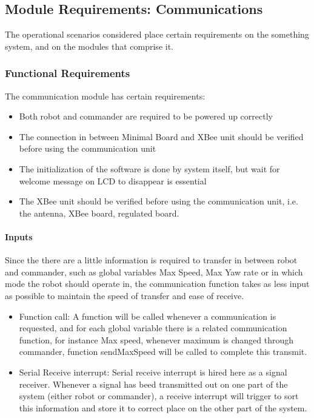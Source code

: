 \documentclass[MTRX3700report.tex]{subfiles}
\begin{document}
\subsection{Module Requirements: Communications}
The operational scenarios considered place certain requirements on the something system, and on the modules that comprise it.
\subsubsection{Functional Requirements}
The communication module has certain requirements:
\begin{itemize}
\item Both robot and commander are required to be powered up correctly
\item The connection in between Minimal Board and XBee unit should be verified before using the communication unit
\item	The initialization of the software is done by system itself, but wait for welcome message on LCD to disappear is essential
\item The XBee unit should be verified before using the communication unit, i.e. the antenna, XBee board, regulated board. 
\end{itemize}

\paragraph{Inputs}
Since the there are a little information is required to transfer in between robot and commander, such as global variables Max Speed, Max Yaw rate or in which mode the robot should operate in, the communication function takes as less input as possible to maintain the speed of transfer and ease of receive.
\begin{itemize}
\item Function call: A function will be called whenever a communication is requested, and for each global variable there is a related communication function, for instance Max speed, whenever maximum is changed through commander, function sendMaxSpeed will be called to complete this transmit.
\item Serial Receive interrupt: Serial receive interrupt is hired here as a signal receiver. Whenever a signal has beed transmitted out on one part of the system (either robot or commander), a receive interrupt will trigger to sort this information and store it to correct place on the other part of the system.
\end{itemize}
\end{document}
